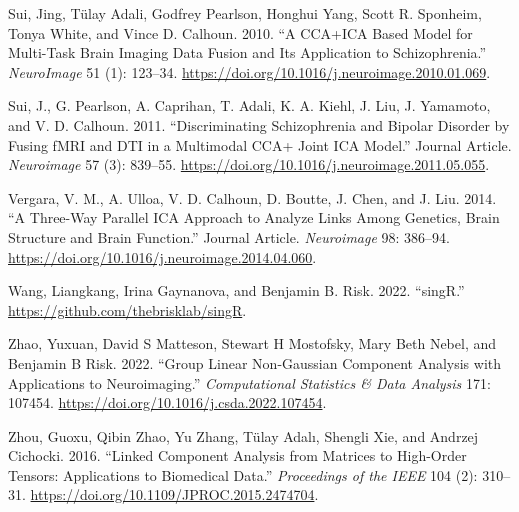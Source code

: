 \begin{CSLReferences}{1}{0}
\leavevmode{}%
Sui, Jing, Tülay Adali, Godfrey Pearlson, Honghui Yang, Scott R. Sponheim, Tonya White, and Vince D. Calhoun. 2010. {``A CCA+ICA Based Model for Multi-Task Brain Imaging Data Fusion and Its Application to Schizophrenia.''} \emph{NeuroImage} 51 (1): 123--34. \url{https://doi.org/10.1016/j.neuroimage.2010.01.069}.

\leavevmode{}%
Sui, J., G. Pearlson, A. Caprihan, T. Adali, K. A. Kiehl, J. Liu, J. Yamamoto, and V. D. Calhoun. 2011. {``Discriminating Schizophrenia and Bipolar Disorder by Fusing fMRI and DTI in a Multimodal CCA+ Joint ICA Model.''} Journal Article. \emph{Neuroimage} 57 (3): 839--55. \url{https://doi.org/10.1016/j.neuroimage.2011.05.055}.

\leavevmode{}%
Vergara, V. M., A. Ulloa, V. D. Calhoun, D. Boutte, J. Chen, and J. Liu. 2014. {``A Three-Way Parallel ICA Approach to Analyze Links Among Genetics, Brain Structure and Brain Function.''} Journal Article. \emph{Neuroimage} 98: 386--94. \url{https://doi.org/10.1016/j.neuroimage.2014.04.060}.

\leavevmode{}%
Wang, Liangkang, Irina Gaynanova, and Benjamin B. Risk. 2022. {``{singR}.''} \url{https://github.com/thebrisklab/singR}.

\leavevmode{}%
Zhao, Yuxuan, David S Matteson, Stewart H Mostofsky, Mary Beth Nebel, and Benjamin B Risk. 2022. {``Group Linear Non-Gaussian Component Analysis with Applications to Neuroimaging.''} \emph{Computational Statistics \& Data Analysis} 171: 107454. \url{https://doi.org/10.1016/j.csda.2022.107454}.

\leavevmode{}%
Zhou, Guoxu, Qibin Zhao, Yu Zhang, Tülay Adalı, Shengli Xie, and Andrzej Cichocki. 2016. {``Linked Component Analysis from Matrices to High-Order Tensors: Applications to Biomedical Data.''} \emph{Proceedings of the IEEE} 104 (2): 310--31. \url{https://doi.org/10.1109/JPROC.2015.2474704}.

\end{CSLReferences}



\address{%
Liangkang Wang\\
Brown University\\%
Department of Biostatistics\\ Providence, Rhode Island, US\\
%
%
\textit{ORCiD: \href{https://orcid.org/0000-0003-3393-243X}{0000-0003-3393-243X}}\\%
\href{mailto:liangkang_wang@brown.edu}{\nolinkurl{liangkang\_wang@brown.edu}}%
}

